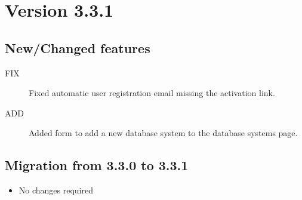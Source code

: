 \section{Version 3.3.1}
\label{sec:3.3.1}

\subsection{New/Changed features}
\begin{description}
	\item[FIX] Fixed automatic user registration email missing the activation link.
	\item[ADD] Added form to add a new database system to the database systems page.
\end{description}

\subsection{Migration from 3.3.0 to 3.3.1}
\begin{itemize}
	\item No changes required
\end{itemize}